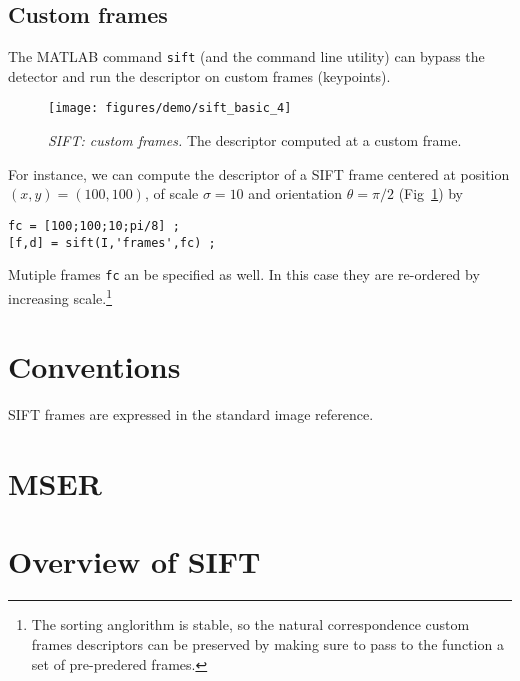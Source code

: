 \documentclass{article}
\begin{document}
\subsection{Custom frames}\label{sift.custom}

The MATLAB command \verb$sift$ (and the command line utility) can
bypass the detector and run the descriptor on custom frames
(keypoints).
\begin{figure}
\begin{center}
\texttt{[image: figures/demo/sift\_basic\_4]}
\end{center}
\caption{{\em SIFT: custom frames.} The descriptor computed at a
  custom frame.}
\label{fig:sift-custom}
\end{figure}
For instance, we can compute the descriptor of a SIFT frame centered
at position $(x,y)=(100,100)$, of scale $\sigma=10$ and orientation
$\theta=\pi/2$ (Fig~\ref{fig:sift-custom}) by
\begin{verbatim}
fc = [100;100;10;pi/8] ;
[f,d] = sift(I,'frames',fc) ;
\end{verbatim}
Mutiple frames \verb$fc$ an be specified as well. In this case they
are re-ordered by increasing scale.\footnote{The sorting anglorithm is
  stable, so the natural correspondence custom frames descriptors can
  be preserved by making sure to pass to the function a set of
  pre-predered frames.}


\section{Conventions}\label{sift.conventions}

SIFT frames are expressed in the standard image reference. 


\section{MSER}\label{mser}


\appendix
\section{Overview of SIFT}\label{sift.overview}
\end{document}
